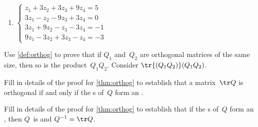 \begin{exercise}
\begin{enumerate}

\item \(\begin{cases}
  z_1+3z_2+3z_3+9z_4=5
\\3z_1-z_2-9z_3+3z_4=0
\\3z_1+9z_2-z_3-3z_4=-1
\\9z_1-3z_2+3z_3-z_4=-3
\end{cases}\)

\end{enumerate}
\end{exercise}




\begin{exercise}\label{ex:orthoprod} 
Use \cref{def:orthog} to prove that if \(Q_1\) and~\(Q_2\) are orthogonal matrices of the same size, then so is the product~\(Q_1Q_2\). 
Consider \(\tr{(Q_1Q_2)}(Q_1Q_2)\).
\end{exercise}

\begin{exercise}  
Fill in details of the proof for \cref{thm:orthog} to establish 
that a matrix~\(\tr Q\) is orthogonal if and 
only if the s of~\(Q\) form an .
\end{exercise}

\begin{exercise}  
Fill in details of the proof for \cref{thm:orthog} to establish that if the s of~\(Q\) form an , then \(Q\)~is  and \(Q^{-1}=\tr Q\).
\end{exercise}

